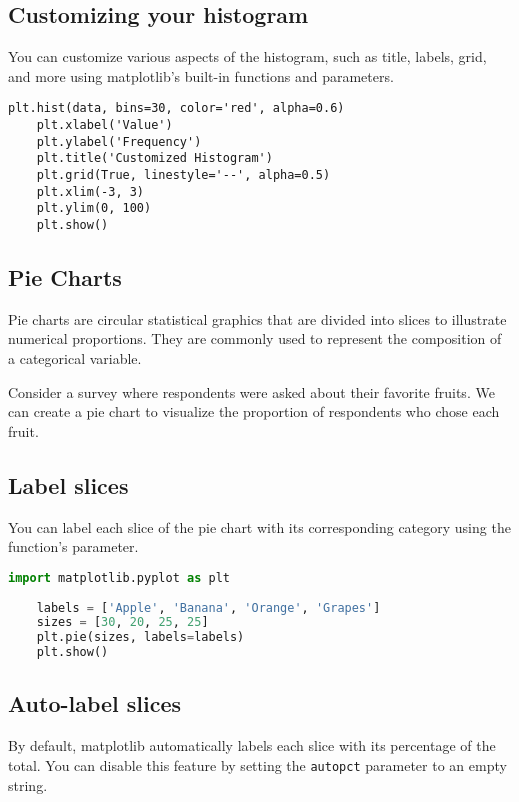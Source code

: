 \subsection*{Customizing your histogram}

You can customize various aspects of the histogram, such as title, labels, grid, and more using matplotlib's built-in functions and parameters.\cite{Matplotlib:2024}

\begin{lstlisting}[caption={Customizing your histogram}, label={lst:custom_histogram}]
	plt.hist(data, bins=30, color='red', alpha=0.6)
	plt.xlabel('Value')
	plt.ylabel('Frequency')
	plt.title('Customized Histogram')
	plt.grid(True, linestyle='--', alpha=0.5)
	plt.xlim(-3, 3)
	plt.ylim(0, 100)
	plt.show()
\end{lstlisting}

\subsection{Pie Charts}

Pie charts are circular statistical graphics that are divided into slices to illustrate numerical proportions. They are commonly used to represent the composition of a categorical variable.

Consider a survey where respondents were asked about their favorite fruits. We can create a pie chart to visualize the proportion of respondents who chose each fruit.\cite{Tosi:2009}

\subsection*{Label slices}

You can label each slice of the pie chart with its corresponding category using the  function's  parameter.

\begin{lstlisting}[language=Python]
	import matplotlib.pyplot as plt
	
	labels = ['Apple', 'Banana', 'Orange', 'Grapes']
	sizes = [30, 20, 25, 25]
	plt.pie(sizes, labels=labels)
	plt.show()
\end{lstlisting}

\subsection*{Auto-label slices}

By default, matplotlib automatically labels each slice with its percentage of the total. You can disable this feature by setting the \texttt{autopct} parameter to an empty string.

